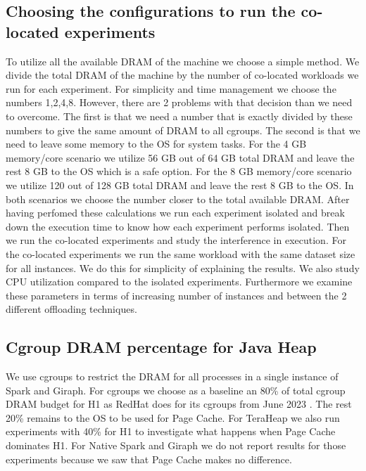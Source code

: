 \subsection{Choosing the configurations to run the co-located experiments}
To utilize all the available DRAM of the machine we choose a simple method. 
We divide the total DRAM of the machine by the number of co-located workloads we run for each experiment.
For simplicity and time management we choose the numbers 1,2,4,8. However, there are 2 problems with that decision
than we need to overcome. The first is that we need a number that is exactly divided by these numbers to give the same amount of DRAM to
all cgroups. The second is that we need to leave some memory to the OS for system tasks. For the 4 GB memory/core scenario we utilize
56 GB out of 64 GB total DRAM and leave the rest 8 GB to the OS which is a safe option. For the 8 GB memory/core scenario we utilize
120 out of 128 GB total DRAM and leave the rest 8 GB to the OS. 
In both scenarios we choose the number closer to
the total available DRAM. After having perfomed these calculations we run each experiment isolated and break down the execution time to know how each experiment performs isolated. Then we run the co-located experiments and study the interference in execution. For the co-located experiments we run the same workload with the same dataset size for all instances. We do this for simplicity of explaining the results. We also study CPU utilization compared to the isolated experiments. Furthermore we examine these parameters in terms of increasing number of instances and between the 2 different offloading techniques. 

\subsection{Cgroup DRAM percentage for Java Heap}
We use cgroups \cite{cgroups} to restrict the DRAM for all processes in a single instance of Spark and Giraph.
For cgroups we choose as a baseline an 80\% of total cgroup DRAM budget for H1 as RedHat does for its cgroups from June 2023 \cite{redhatblog}.
The rest 20\% remains to the OS to be used for Page Cache.
For TeraHeap we also run experiments with 40\% for H1 to investigate what happens when Page Cache dominates H1.
For Native Spark and Giraph we do not report results for those experiments because we saw that Page Cache makes no difference.


